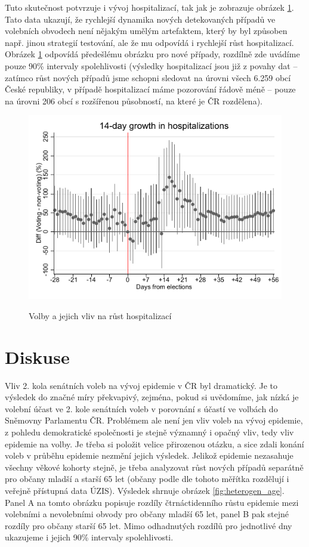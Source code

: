 Tuto skutečnost potvrzuje i vývoj hospitalizací, tak jak je zobrazuje obrázek \ref{fig:hospit_growth}. Tato data ukazují, že rychlejší dynamika nových detekovaných případů ve volebních obvodech není nějakým umělým artefaktem, který by byl způsoben např. jinou strategií testování, ale že mu odpovídá i rychlejší růst hospitalizací. Obrázek  \ref{fig:hospit_growth} odpovídá předešlému obrázku pro nové případy, rozdílně zde uvádíme pouze 90\% intervaly spolehlivosti (výsledky hospitalizací jsou  již z povahy dat -- zatímco růst nových případů jsme schopni sledovat na úrovni všech 6.259 obcí České republiky, v případě hospitalizací máme pozorování řádově méně -- pouze na úrovni 206 obcí s rozšířenou působností, na které je ČR rozdělena).

\begin{figure}    
    \centering
    \includegraphics[scale=1]{Hospitalization_growth14.pdf}
     \label{fig:hospit_growth}
    \caption{Volby a jejich vliv na růst hospitalizací}
\end{figure}

\section*{Diskuse}
Vliv 2. kola senátních voleb na vývoj epidemie v ČR byl dramatický. Je to výsledek do značné míry překvapivý, zejména, pokud si uvědomíme, jak nízká je volební účast ve 2. kole senátních voleb v porovnání s účastí ve volbách do Sněmovny Parlamentu ČR. Problémem ale není jen vliv voleb na vývoj epidemie, z pohledu demokratické společnosti je stejně významný i opačný vliv, tedy vliv epidemie na volby. Je třeba si položit velice přirozenou otázku, a sice zdali konání voleb v průběhu epidemie nezmění jejich výsledek. Jelikož epidemie nezasahuje všechny věkové kohorty stejně, je třeba analyzovat růst nových případů separátně pro občany mladší a starší 65 let (občany podle dle tohoto měřítka rozdělují i veřejně přístupná data ÚZIS). Výsledek shrnuje obrázek  \ref{fig:heterogen_age}. Panel A na tomto obrázku popisuje rozdíly čtrnáctidenního růstu epidemie mezi volebními a nevolebními obvody pro občany mladší 65 let, panel B pak stejné rozdíly pro občany starší 65 let. Mimo odhadnutých rozdílů pro jednotlivé dny ukazujeme i jejich 90\% intervaly spolehlivosti.


